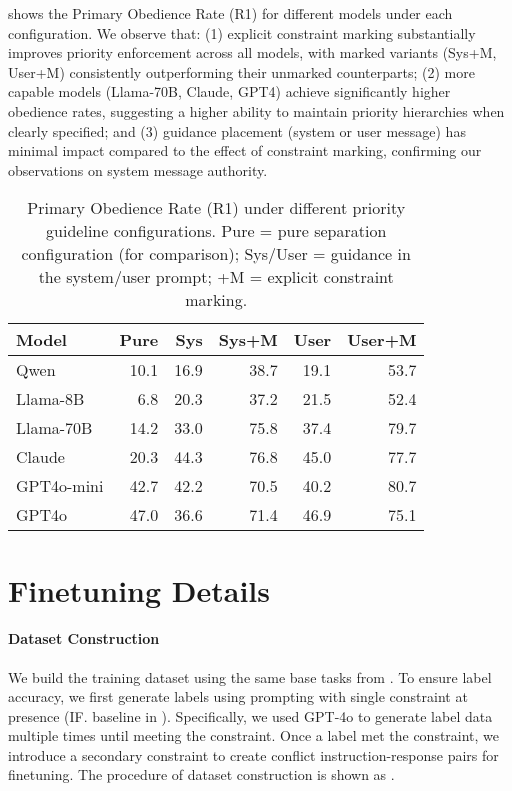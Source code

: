  shows the Primary Obedience Rate (R1) for different models under each configuration. We observe that: (1) explicit constraint marking substantially improves priority enforcement across all models, with marked variants (Sys+M, User+M) consistently outperforming their unmarked counterparts; (2) more capable models (Llama-70B, Claude, GPT4) achieve significantly higher obedience rates, suggesting a higher ability to maintain priority hierarchies when clearly specified; and (3) guidance placement (system or user message) has minimal impact compared to the effect of constraint marking, confirming our observations on system message authority.

\begin{table}[h]
    \centering
    \small
    \begin{tabular}{lrrrrr}
    \toprule
    Model & Pure & Sys & Sys+M & User & User+M \\
    \midrule
    Qwen & 10.1 & 16.9 & 38.7 & 19.1 & 53.7 \\
    Llama-8B & 6.8 & 20.3 & 37.2 & 21.5 & 52.4 \\
    Llama-70B & 14.2 & 33.0 & 75.8 & 37.4 & 79.7 \\
    Claude & 20.3 & 44.3 & 76.8 & 45.0 & 77.7 \\
    GPT4o-mini & 42.7 & 42.2 & 70.5 & 40.2 & 80.7 \\
    GPT4o & 47.0 & 36.6 & 71.4 & 46.9 & 75.1 \\
    \bottomrule
    \end{tabular}
    \caption{Primary Obedience Rate (R1) under different priority guideline configurations. Pure = pure separation configuration (for comparison); Sys/User = guidance in the system/user prompt; +M = explicit constraint marking.}
    \label{tab:prompt_analysis}
\end{table}


\section{Finetuning Details} \label{app:finetune_data}
\paragraph{Dataset Construction}
We build the training dataset using the same base tasks from . To ensure label accuracy, we first generate labels using prompting with single constraint at presence (IF. baseline in ). Specifically, we used GPT-4o to generate label data multiple times until meeting the constraint. Once a label met the constraint, we introduce a secondary constraint to create conflict instruction-response pairs for finetuning. The procedure of dataset construction is shown as . 

